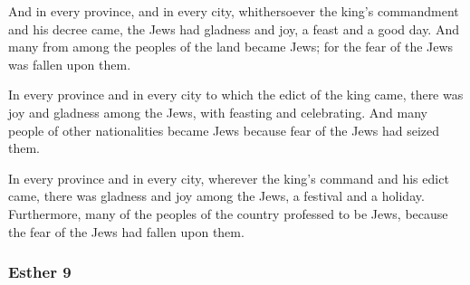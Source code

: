 			\begin{versebox}
					\item[BHS] 
					\item[LXX] 
					\item[ASV] And in every province, and in every city, whithersoever the king's commandment and his decree came, the Jews had gladness and joy, a feast and a good day. And many from among the peoples of the land became Jews; for the fear of the Jews was fallen upon them.
					\item[NIV] In every province and in every city to which the edict of the king came, there was joy and gladness among the Jews, with feasting and celebrating. And many people of other nationalities became Jews because fear of the Jews had seized them.
					\item[NRSV] In every province and in every city, wherever the king’s command and his edict came, there was gladness and joy among the Jews, a festival and a holiday. Furthermore, many of the peoples of the country professed to be Jews, because the fear of the Jews had fallen upon them.
			\end{versebox}
	\subsubsection{Esther 9} %
		\label{ESTHER-9}

